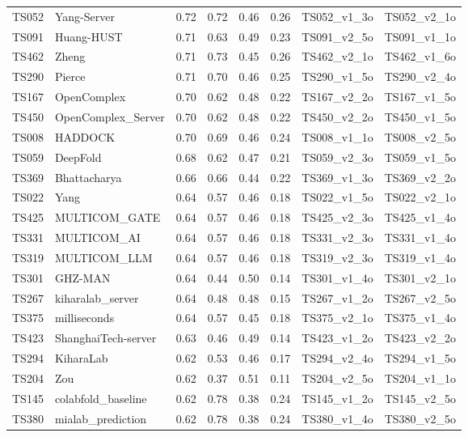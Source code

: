 \begin{longtable}{llllllll}
TS052 & Yang-Server & 0.72 & 0.72 & 0.46 & 0.26 & TS052\_v1\_3o & TS052\_v2\_1o \\ 
TS091 & Huang-HUST & 0.71 & 0.63 & 0.49 & 0.23 & TS091\_v2\_5o & TS091\_v1\_1o \\ 
TS462 & Zheng & 0.71 & 0.73 & 0.45 & 0.26 & TS462\_v2\_1o & TS462\_v1\_6o \\ 
TS290 & Pierce & 0.71 & 0.70 & 0.46 & 0.25 & TS290\_v1\_5o & TS290\_v2\_4o \\ 
TS167 & OpenComplex & 0.70 & 0.62 & 0.48 & 0.22 & TS167\_v2\_2o & TS167\_v1\_5o \\ 
TS450 & OpenComplex\_Server & 0.70 & 0.62 & 0.48 & 0.22 & TS450\_v2\_2o & TS450\_v1\_5o \\ 
TS008 & HADDOCK & 0.70 & 0.69 & 0.46 & 0.24 & TS008\_v1\_1o & TS008\_v2\_5o \\ 
TS059 & DeepFold & 0.68 & 0.62 & 0.47 & 0.21 & TS059\_v2\_3o & TS059\_v1\_5o \\ 
TS369 & Bhattacharya & 0.66 & 0.66 & 0.44 & 0.22 & TS369\_v1\_3o & TS369\_v2\_2o \\ 
TS022 & Yang & 0.64 & 0.57 & 0.46 & 0.18 & TS022\_v1\_5o & TS022\_v2\_1o \\ 
TS425 & MULTICOM\_GATE & 0.64 & 0.57 & 0.46 & 0.18 & TS425\_v2\_3o & TS425\_v1\_4o \\ 
TS331 & MULTICOM\_AI & 0.64 & 0.57 & 0.46 & 0.18 & TS331\_v2\_3o & TS331\_v1\_4o \\ 
TS319 & MULTICOM\_LLM & 0.64 & 0.57 & 0.46 & 0.18 & TS319\_v2\_3o & TS319\_v1\_4o \\ 
TS301 & GHZ-MAN & 0.64 & 0.44 & 0.50 & 0.14 & TS301\_v1\_4o & TS301\_v2\_1o \\ 
TS267 & kiharalab\_server & 0.64 & 0.48 & 0.48 & 0.15 & TS267\_v1\_2o & TS267\_v2\_5o \\ 
TS375 & milliseconds & 0.64 & 0.57 & 0.45 & 0.18 & TS375\_v2\_1o & TS375\_v1\_4o \\ 
TS423 & ShanghaiTech-server & 0.63 & 0.46 & 0.49 & 0.14 & TS423\_v1\_2o & TS423\_v2\_2o \\ 
TS294 & KiharaLab & 0.62 & 0.53 & 0.46 & 0.17 & TS294\_v2\_4o & TS294\_v1\_5o \\ 
TS204 & Zou & 0.62 & 0.37 & 0.51 & 0.11 & TS204\_v2\_5o & TS204\_v1\_1o \\ 
TS145 & colabfold\_baseline & 0.62 & 0.78 & 0.38 & 0.24 & TS145\_v1\_2o & TS145\_v2\_5o \\ 
TS380 & mialab\_prediction & 0.62 & 0.78 & 0.38 & 0.24 & TS380\_v1\_4o & TS380\_v2\_5o \\ 

\end{longtable}
